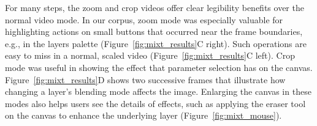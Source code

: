  For many steps, the zoom and crop videos offer clear legibility benefits over the normal video mode. In our corpus, zoom mode was especially valuable for highlighting actions on small buttons that occurred near the frame boundaries, e.g., in the layers palette (Figure~\ref{fig:mixt_results}C right). Such operations are easy to miss in a normal, scaled video (Figure~\ref{fig:mixt_results}C left). Crop mode was useful in showing the effect that parameter selection has on the canvas. Figure~\ref{fig:mixt_results}D shows two successive frames that illustrate how changing a layer's blending mode affects the image. Enlarging the canvas in these modes also helps users see the details of effects, such as applying the eraser tool on the canvas to enhance the underlying layer (Figure~\ref{fig:mixt_mouse}).


